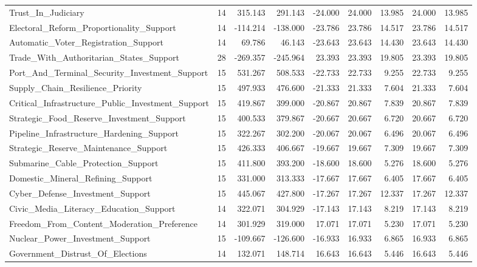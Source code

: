 \begin{table}[htbp]
\begin{threeparttable}
\begin{adjustbox}{max width=\linewidth}
\begin{tabular}{lrrrrrrrr}
Trust\_In\_Judiciary & 14 & 315.143 & 291.143 & -24.000 & 24.000 & 13.985 & 24.000 & 13.985 \\
Electoral\_Reform\_Proportionality\_Support & 14 & -114.214 & -138.000 & -23.786 & 23.786 & 14.517 & 23.786 & 14.517 \\
Automatic\_Voter\_Registration\_Support & 14 & 69.786 & 46.143 & -23.643 & 23.643 & 14.430 & 23.643 & 14.430 \\
Trade\_With\_Authoritarian\_States\_Support & 28 & -269.357 & -245.964 & 23.393 & 23.393 & 19.805 & 23.393 & 19.805 \\
Port\_And\_Terminal\_Security\_Investment\_Support & 15 & 531.267 & 508.533 & -22.733 & 22.733 & 9.255 & 22.733 & 9.255 \\
Supply\_Chain\_Resilience\_Priority & 15 & 497.933 & 476.600 & -21.333 & 21.333 & 7.604 & 21.333 & 7.604 \\
Critical\_Infrastructure\_Public\_Investment\_Support & 15 & 419.867 & 399.000 & -20.867 & 20.867 & 7.839 & 20.867 & 7.839 \\
Strategic\_Food\_Reserve\_Investment\_Support & 15 & 400.533 & 379.867 & -20.667 & 20.667 & 6.720 & 20.667 & 6.720 \\
Pipeline\_Infrastructure\_Hardening\_Support & 15 & 322.267 & 302.200 & -20.067 & 20.067 & 6.496 & 20.067 & 6.496 \\
Strategic\_Reserve\_Maintenance\_Support & 15 & 426.333 & 406.667 & -19.667 & 19.667 & 7.309 & 19.667 & 7.309 \\
Submarine\_Cable\_Protection\_Support & 15 & 411.800 & 393.200 & -18.600 & 18.600 & 5.276 & 18.600 & 5.276 \\
Domestic\_Mineral\_Refining\_Support & 15 & 331.000 & 313.333 & -17.667 & 17.667 & 6.405 & 17.667 & 6.405 \\
Cyber\_Defense\_Investment\_Support & 15 & 445.067 & 427.800 & -17.267 & 17.267 & 12.337 & 17.267 & 12.337 \\
Civic\_Media\_Literacy\_Education\_Support & 14 & 322.071 & 304.929 & -17.143 & 17.143 & 8.219 & 17.143 & 8.219 \\
Freedom\_From\_Content\_Moderation\_Preference & 14 & 301.929 & 319.000 & 17.071 & 17.071 & 5.230 & 17.071 & 5.230 \\
Nuclear\_Power\_Investment\_Support & 15 & -109.667 & -126.600 & -16.933 & 16.933 & 6.865 & 16.933 & 6.865 \\
Government\_Distrust\_Of\_Elections & 14 & 132.071 & 148.714 & 16.643 & 16.643 & 5.446 & 16.643 & 5.446 \\

\end{tabular}
\end{adjustbox}
\end{threeparttable}
\end{table}
